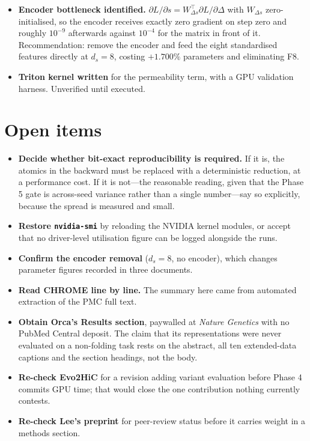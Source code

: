 \documentclass[11pt,a4paper]{article}
\newcommand{\code}[1]{\texttt{\small #1}}
\begin{document}
\begin{itemize}
effect on the gate gradient: $2.06\times10^{-7} \to 7.69\times10^{-6}$.
\item \textbf{Encoder bottleneck identified.} $\partial L/\partial s =
W_{\Delta s}^{\top}\partial L/\partial \Delta$ with $W_{\Delta s}$
zero-initialised, so the encoder receives exactly zero gradient on step zero and
roughly $10^{-9}$ afterwards against $10^{-4}$ for the matrix in front of it.
Recommendation: remove the encoder and feed the eight standardised features
directly at $d_s=8$, costing $+1.700\%$ parameters and eliminating F8.
\item \textbf{Triton kernel written} for the permeability term, with a GPU
validation harness. Unverified until executed.
\end{itemize}

\section{Open items}

\begin{itemize}
\item \textbf{Decide whether bit-exact reproducibility is required.} If it is,
the atomics in the backward must be replaced with a deterministic reduction,
at a performance cost. If it is not---the reasonable reading, given that the
Phase 5 gate is across-seed variance rather than a single number---say so
explicitly, because the spread is measured and small.
\item \textbf{Restore \code{nvidia-smi}} by reloading the NVIDIA kernel
modules, or accept that no driver-level utilisation figure can be logged
alongside the runs.
\item \textbf{Confirm the encoder removal} ($d_s=8$, no encoder), which changes
parameter figures recorded in three documents.
\item \textbf{Read CHROME line by line.} The summary here came from automated
extraction of the PMC full text.
\item \textbf{Obtain Orca's Results section}, paywalled at \emph{Nature
Genetics} with no PubMed Central deposit. The claim that its representations were
never evaluated on a non-folding task rests on the abstract, all ten
extended-data captions and the section headings, not the body.
\item \textbf{Re-check Evo2HiC} for a revision adding variant evaluation before
Phase 4 commits GPU time; that would close the one contribution nothing
currently contests.
\item \textbf{Re-check Lee's preprint} for peer-review status before it carries
weight in a methods section.
\end{itemize}
\end{document}
